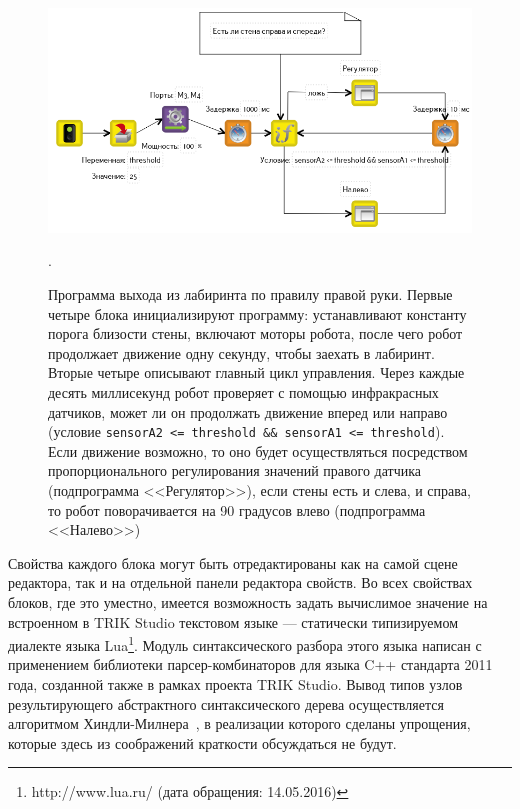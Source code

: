\documentclass[a5paper]{article}
\begin{document}
\begin{figure}[ht]
    \centering
    \includegraphics[width=4.5in]{TS_CF_Labyrinth_Diagram.png}
    \caption{Программа выхода из лабиринта по правилу правой руки. Первые четыре блока инициализируют программу: устанавливают константу порога близости стены, включают моторы робота, после чего робот продолжает движение одну секунду, чтобы заехать в лабиринт. Вторые четыре описывают главный цикл управления. Через каждые десять миллисекунд робот проверяет с помощью инфракрасных датчиков, может ли он продолжать движение вперед или направо (условие \texttt{sensorA2 <= threshold \&\& sensorA1 <= threshold}). Если движение возможно, то оно будет осуществляться посредством пропорционального регулирования значений правого датчика (подпрограмма <<Регулятор>>), если стены есть и слева, и справа, то робот поворачивается на 90 градусов влево (подпрограмма <<Налево>>)}.
    \label{image:TS_CF_Example}
\end{figure}

Свойства каждого блока могут быть отредактированы как на самой сцене редактора, так и на отдельной панели редактора свойств. Во всех свойствах блоков, где это уместно, имеется возможность задать вычислимое значение на встроенном в TRIK Studio текстовом языке --- статически типизируемом диалекте языка Lua\footnote{http://www.lua.ru/ (дата обращения: 14.05.2016)}. Модуль синтаксического разбора этого языка написан с применением библиотеки парсер-комбинаторов для языка C++ стандарта 2011 года, созданной также в рамках проекта TRIK Studio. Вывод типов узлов результирующего абстрактного синтаксического дерева осуществляется алгоритмом Хиндли-Милнера~\cite{damas1982principal}, в реализации которого сделаны упрощения, которые здесь из соображений краткости обсуждаться не будут.
\end{document}
